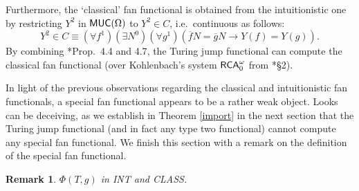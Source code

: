 \documentclass[reqno]{amsart}
\newtheorem{rem}[thm]{Remark}
\def\RCAo{\textup{\textsf{RCA}}_{0}^{\omega}}
\def\MUC{\textup{\textsf{MUC}}}
\def\di{\rightarrow}
\numberwithin{equation}{section}
\numberwithin{thm}{section}
\begin{document}
\medskip


Furthermore, the `classical' fan functional is obtained from the intuitionistic one by restricting $Y^{2}$ in $\MUC(\Omega)$ to $Y^{2}\in C$, i.e.\ continuous as follows:
\[
Y^{2}\in C\equiv (\forall f^{1})(\exists N^{0})(\forall g^{1})(\overline{f}N=\overline{g}N\di Y(f)=Y(g)).  
\]
By combining \cite{kohlenbach4}*{Prop.\ 4.4 and 4.7}, the Turing jump functional can compute the classical fan functional (over Kohlenbach's system $\RCAo$ from \cite{kohlenbach2}*{\S2}).  

\medskip

In light of the previous observations regarding the classical and intuitionistic fan functionals, a special fan functional appears to be a rather weak object.     
Looks can be deceiving, as we establish in Theorem \ref{import} in the next section that the Turing jump functional (and in fact any type two functional) cannot compute any special fan functional.
We finish this section with a remark on the definition of the special fan functional.
\begin{rem}\rm
$\Phi(T, g)$ in INT and CLASS. 
\end{rem}
\end{document}
